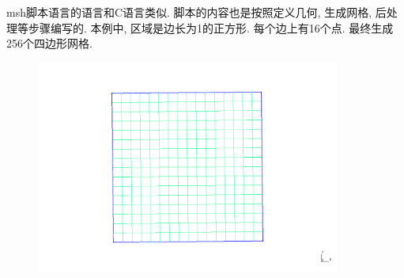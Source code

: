 \documentclass[12pt]{article}
\begin{document}
\begin{CJK}{UTF8}{gkai}
 msh脚本语言的语言和C语言类似. 脚本的内容也是按照定义几何, 生成网格, 后处理等步骤编写的. 本例中, 区域是边长为1的正方形. 每个边上有16个点. 最终生成256个四边形网格. \\
\begin{figure}[H]
	\centering
	\includegraphics[width=10cm]{junyun.png}
	\caption{}  		
\end{figure}

\end{CJK}
\end{document}
